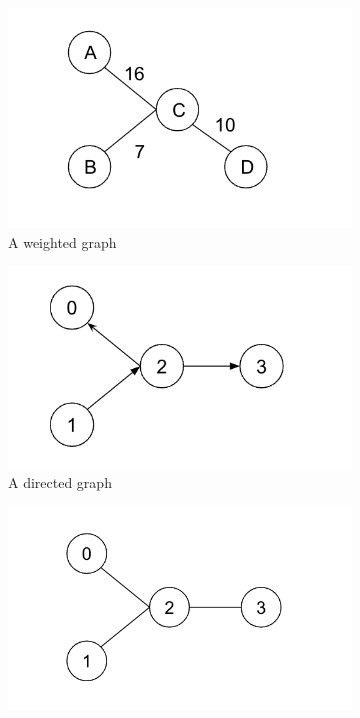 \documentclass[12pt,a4paper]{report}
\begin{document}
\begin{figure}[ht]
    \centering
    \begin{subfigure}[ht]{0.33\textwidth}
        \centering
        \includegraphics[width=\textwidth]{diss_images/context/weighted.png}
        \caption{A weighted graph}
        \label{fig:weighted}
    \end{subfigure}
    \hfill
    \begin{subfigure}[ht]{0.32\textwidth}
        \centering
        \includegraphics[width=\textwidth]{diss_images/context/directed.png}
        \caption{A directed graph}
        \label{fig:directed}
    \end{subfigure}
    \hfill
    \begin{subfigure}[ht]{0.32\textwidth}
        \centering
        \includegraphics[width=\textwidth]{diss_images/context/undirected.png}

\end{subfigure}
\end{figure}
\end{document}
